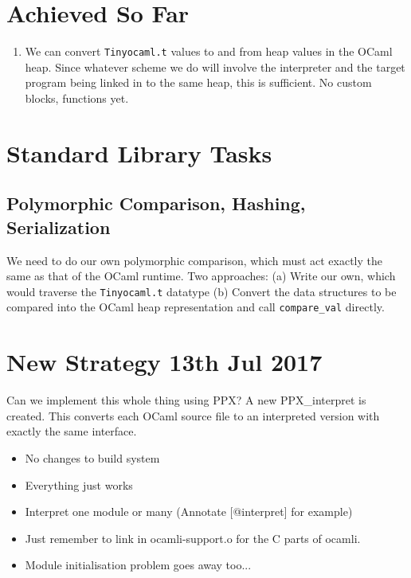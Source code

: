 \documentclass[10pt]{article}
\begin{document}
\section*{Achieved So Far}

\begin{enumerate}
\item We can convert \texttt{Tinyocaml.t} values to and from heap values in the OCaml heap. Since whatever scheme we do will involve the interpreter and the target program being linked in to the same heap, this is sufficient. No custom blocks, functions yet.
\end{enumerate}

\section*{Standard Library Tasks}

\subsection*{Polymorphic Comparison, Hashing, Serialization}

We need to do our own polymorphic comparison, which must act exactly the same as that of the OCaml runtime. Two approaches: (a) Write our own, which would traverse the \texttt{Tinyocaml.t} datatype (b) Convert the data structures to be compared into the OCaml heap representation and call \texttt{compare\_val} directly.

\section*{New Strategy 13th Jul 2017}

Can we implement this whole thing using PPX? A new \textsf{PPX\_interpret} is created. This converts each OCaml source file to an interpreted version with exactly the same interface.

\begin{itemize}
\item No changes to build system
\item Everything just works
\item Interpret one module or many (Annotate [@interpret] for example)
\item Just remember to link in ocamli-support.o for the C parts of ocamli.
\item Module initialisation problem goes away too...
\end{itemize}
\end{document}
